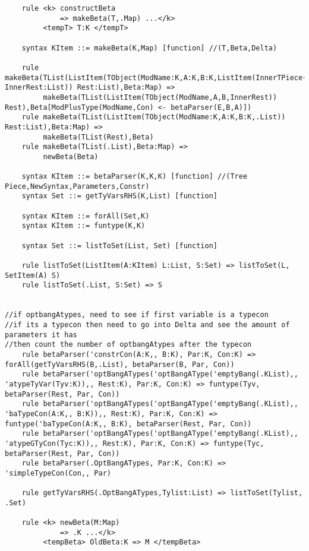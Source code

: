 \begin{lstlisting}
    rule <k> constructBeta
             => makeBeta(T,.Map) ...</k>
         <tempT> T:K </tempT>

    syntax KItem ::= makeBeta(K,Map) [function] //(T,Beta,Delta)

    rule makeBeta(TList(ListItem(TObject(ModName:K,A:K,B:K,ListItem(InnerTPiece(Con:K,H:K,D:K,E:K,F:K)) InnerRest:List)) Rest:List),Beta:Map) =>
         makeBeta(TList(ListItem(TObject(ModName,A,B,InnerRest)) Rest),Beta[ModPlusType(ModName,Con) <- betaParser(E,B,A)])
    rule makeBeta(TList(ListItem(TObject(ModName:K,A:K,B:K,.List)) Rest:List),Beta:Map) =>
         makeBeta(TList(Rest),Beta)
    rule makeBeta(TList(.List),Beta:Map) =>
         newBeta(Beta)

    syntax KItem ::= betaParser(K,K,K) [function] //(Tree Piece,NewSyntax,Parameters,Constr)
    syntax Set ::= getTyVarsRHS(K,List) [function]

    syntax KItem ::= forAll(Set,K)
    syntax KItem ::= funtype(K,K)

    syntax Set ::= listToSet(List, Set) [function]

    rule listToSet(ListItem(A:KItem) L:List, S:Set) => listToSet(L, SetItem(A) S)
    rule listToSet(.List, S:Set) => S


//if optbangAtypes, need to see if first variable is a typecon
//if its a typecon then need to go into Delta and see the amount of parameters it has
//then count the number of optbangAtypes after the typecon
    rule betaParser('constrCon(A:K,, B:K), Par:K, Con:K) => forAll(getTyVarsRHS(B,.List), betaParser(B, Par, Con))
    rule betaParser('optBangATypes('optBangAType('emptyBang(.KList),, 'atypeTyVar(Tyv:K)),, Rest:K), Par:K, Con:K) => funtype(Tyv, betaParser(Rest, Par, Con))
    rule betaParser('optBangATypes('optBangAType('emptyBang(.KList),, 'baTypeCon(A:K,, B:K)),, Rest:K), Par:K, Con:K) => funtype('baTypeCon(A:K,, B:K), betaParser(Rest, Par, Con))
    rule betaParser('optBangATypes('optBangAType('emptyBang(.KList),, 'atypeGTyCon(Tyc:K)),, Rest:K), Par:K, Con:K) => funtype(Tyc, betaParser(Rest, Par, Con))
    rule betaParser(.OptBangATypes, Par:K, Con:K) => 'simpleTypeCon(Con,, Par)

    rule getTyVarsRHS(.OptBangATypes,Tylist:List) => listToSet(Tylist, .Set)

    rule <k> newBeta(M:Map)
             => .K ...</k>
         <tempBeta> OldBeta:K => M </tempBeta>
\end{lstlisting}

